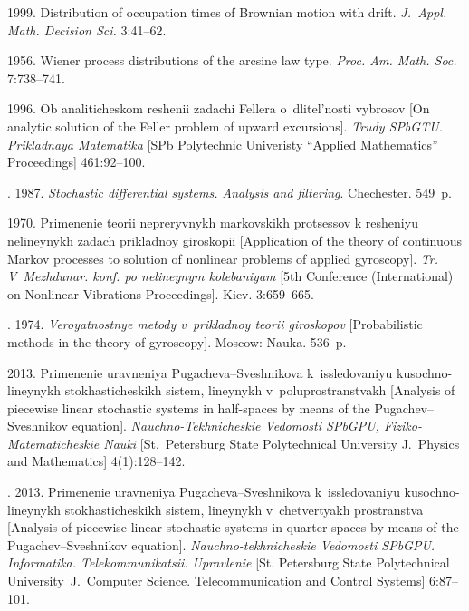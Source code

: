\begin{multicols}{2}
{{\begin{thebibliography}{99}
 1999. Distribution of occupation times of Brownian motion with drift. \textit{J.~Appl. Math. Decision Sci.} 3:41--62.

 1956. Wiener process distributions of the arcsine law type. \textit{Proc. Am. Math. Soc.} 7:738--741.

 1996. Ob analiticheskom reshenii zadachi Fellera o~dlitel'nosti vybrosov [On analytic solution of the Feller problem of upward excursions]. \textit{Trudy \mbox{SPbGTU}. Prikladnaya Matematika} [SPb Polytechnic Univeristy ``Applied Mathematics'' Proceedings] 461:92--100.


. 1987. \textit{Stochastic differential systems. Analysis and filtering}. Chechester. 549~p.


 1970. Primenenie teorii nepreryvnykh markovskikh protsessov k resheniyu nelineynykh zadach prikladnoy giroskopii [Application of the theory of continuous Markov processes to solution of nonlinear problems of applied gyroscopy]. \textit{Tr. V~Mezhdunar. konf. po nelineynym kolebaniyam} [5th Conference (International) on Nonlinear Vibrations Proceedings]. Kiev. 3:659--665.

. 1974. \textit{Veroyatnostnye metody v~prikladnoy teorii giroskopov} [Probabilistic methods in the theory of gyroscopy]. Moscow: Nauka. 536~p.

 2013. Primenenie uravneniya Pu\-ga\-che\-va--Svesh\-ni\-ko\-va k~issledovaniyu ku\-soch\-no-li\-ney\-nykh sto\-kha\-sti\-che\-skikh sistem, lineynykh v~poluprostranstvakh [Analysis of piecewise linear stochastic systems in half-spaces by means of the Pugachev--Sveshnikov equation]. \textit{Na\-uch\-no-Tekh\-ni\-che\-skie Vedomosti SPbGPU, Fiziko-Matematicheskie Nauki} [St.\ Petersburg State Polytechnical University
J.~Physics and Mathematics] 4(1):128--142.

. 2013. Primenenie uravneniya Pu\-ga\-che\-va--Svesh\-ni\-ko\-va k~issledovaniyu \mbox{kusochno}-\mbox{lineynykh} stokhasticheskikh sistem, lineynykh v~chetvertyakh prostranstva [Analysis of piecewise linear stochastic systems in quarter-spaces by means of the Pugachev--Sveshnikov equation]. \textit{Nauchno-tekhnicheskie Vedomosti SPbGPU. Informatika. Telekommunikatsii. Upravlenie} [St. Petersburg State Polytechnical University~J.~Computer Science. Telecommunication and Control Systems] 6:87--101.


\end{thebibliography}}}
\end{multicols}
